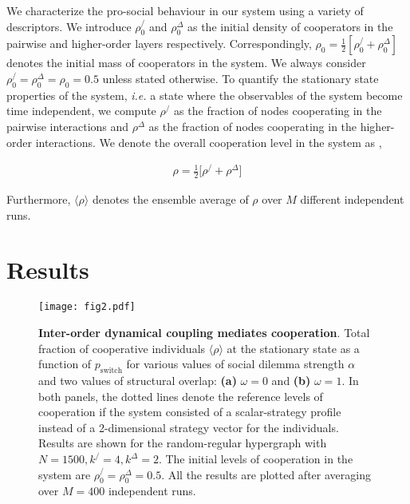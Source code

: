 \documentclass[a4paper,pre,reqno,superscriptaddress,twocolumn, floatfix]{revtex4}
\begin{document}
We characterize the pro-social behaviour in our system using a variety of descriptors. We introduce $\rho_0^/$ and $\rho_0^{\Delta}$ as the initial density of cooperators in the pairwise and higher-order layers respectively. Correspondingly, $\rho_0 = \frac{1}{2} [\rho_0^/+\rho_0^{\Delta}]$ denotes the initial mass of cooperators in the system. We always consider $\rho_0^/=\rho_0^{\Delta}=\rho_0 = 0.5$ unless stated otherwise. To quantify the stationary state properties of the system, \textit{i.e.} a state where the observables of the system become time independent, we compute $\rho^/$ as the fraction of nodes cooperating in the pairwise interactions and $\rho^{\Delta}$ as the fraction of nodes cooperating in the higher-order interactions. We denote the overall cooperation level in the system as \cite{wang_evolutionary_2015, battiston_determinants_2017},

\begin{align}
    \rho = \frac{1}{2} \big[\rho^/ + \rho^{\Delta}\big]
\end{align}

Furthermore, $\langle \rho \rangle$ denotes the ensemble average of $\rho$ over $M$ different independent runs. 


\section{Results}\label{sec:results}

\begin{figure*}[!ht]
    \centering
    \texttt{[image: fig2.pdf]}
    \caption{\textbf{Inter-order dynamical coupling mediates cooperation}. Total fraction of cooperative individuals $\langle \rho \rangle$ at the stationary state as a function of $p_{\text{switch}}$ for various values of social dilemma strength $\alpha$ and two values of structural overlap: \textbf{(a)} $\omega=0$ and \textbf{(b)} $\omega=1$. In both panels, the dotted lines denote the reference levels of cooperation if the system consisted of a scalar-strategy profile instead of a 2-dimensional strategy vector for the individuals. Results are shown for the random-regular hypergraph with $N=1500, k^/=4, k^{\Delta}=2$. The initial levels of cooperation in the system are $\rho_0^/=\rho_0^{\Delta}=0.5$. All the results are plotted after averaging over $M=400$ independent runs.}
    \label{fig:p_switch}
\end{figure*}
\end{document}
